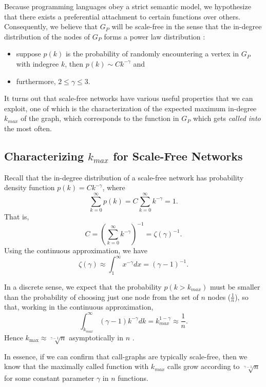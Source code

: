 \documentclass[11pt,a4paper,twocolumn]{article}
\begin{document}
\begin{singlespace}
Because programming languages obey a strict semantic model, we hypothesize that
there exists a preferential attachment to certain functions over others.
Consequently, we believe that $G_P$ will be scale-free in the sense that
the in-degree distribution of the nodes of $G_P$ forms a power law
distribution \cite{DUR}:

\begin{itemize}
\item suppose $p(k)$ is the probability of randomly encountering a vertex in $G_P$
with indegree $k$, then $p(k)\sim Ck^{-\gamma}$ and
\item furthermore, $2\leq\gamma\leq 3$.
\end{itemize}

It turns out that scale-free networks have various useful properties that we
can exploit, one of which is the characterization of the expected maximum
in-degree $k_{max}$ of the graph, which corresponds to the function in $G_P$
which gets \emph{called into} the most often.
\subsection{Characterizing $k_{max}$ for Scale-Free Networks}

Recall that the in-degree distribution of a scale-free network has probability
density function $p(k)=Ck^{-\gamma}$, where
\[\sum_{k=0}^{\infty} p(k) = C\sum_{k=0}^{\infty} k^{-\gamma} = 1.\]
That is,
\begin{equation}C=\left(\sum_{k=0}^{\infty} k^{-\gamma}\right)^{-1}
=\zeta(\gamma)^{-1}.\end{equation}
Using the continuous approximation, we have
\begin{equation}\zeta(\gamma)\approx \int_1^{\infty} x^{-\gamma} dx
=(\gamma-1)^{-1}.\end{equation}

In a discrete sense, we expect that the probability $p\left(k>k_{max}\right)$
must be smaller than the probability of choosing just one node from the set
of $n$ nodes ($\frac{1}{n}$), so that, working in the continuous approximation,
\begin{equation}\int_{k_{max}}^{\infty} (\gamma-1)k^{-\gamma} dk
=k_{max}^{1-\gamma}\approx \frac{1}{n}.\end{equation}
Hence $k_{\max}\approx \sqrt[\gamma - 1]{n}$ asymptotically in $n$ \cite{CLASS}.

In essence, if we can confirm that call-graphs are typically scale-free, then we know
that the maximally called function with $k_{max}$ calls grow according to
$\sqrt[\gamma - 1]{n}$ for some constant parameter $\gamma$ in $n$ functions.

\end{singlespace}
\end{document}
